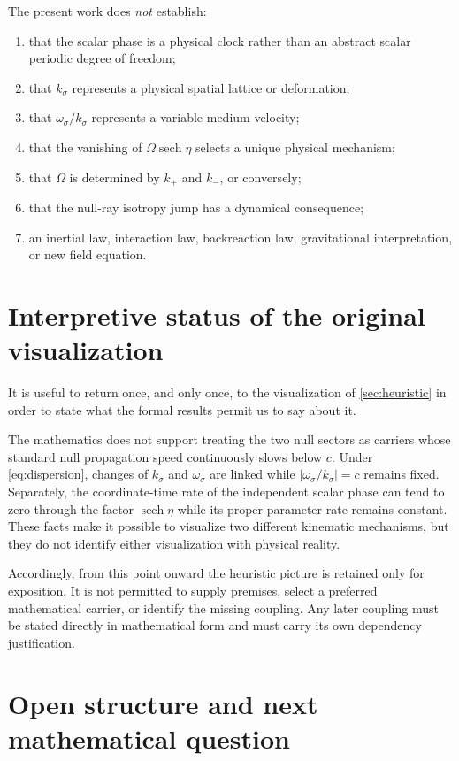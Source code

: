 \documentclass[11pt,a4paper]{article}
\newcommand{\sech}{\operatorname{sech}}
\begin{document}
The present work does \emph{not} establish:
\begin{enumerate}[label=\arabic*.]
\item that the scalar phase is a physical clock rather than an abstract scalar periodic degree of freedom;
\item that $k_\sigma$ represents a physical spatial lattice or deformation;
\item that $\omega_\sigma/k_\sigma$ represents a variable medium velocity;
\item that the vanishing of $\Omega\sech\eta$ selects a unique physical mechanism;
\item that $\Omega$ is determined by $k_+$ and $k_-$, or conversely;
\item that the null-ray isotropy jump has a dynamical consequence;
\item an inertial law, interaction law, backreaction law, gravitational interpretation, or new field equation.
\end{enumerate}

\section{Interpretive status of the original visualization}

It is useful to return once, and only once, to the visualization of \cref{sec:heuristic} in order to state what the formal results permit us to say about it.

The mathematics does not support treating the two null sectors as carriers whose standard null propagation speed continuously slows below $c$.  Under \eqref{eq:dispersion}, changes of $k_\sigma$ and $\omega_\sigma$ are linked while $|\omega_\sigma/k_\sigma|=c$ remains fixed.  Separately, the coordinate-time rate of the independent scalar phase can tend to zero through the factor $\sech\eta$ while its proper-parameter rate remains constant.  These facts make it possible to visualize two different kinematic mechanisms, but they do not identify either visualization with physical reality.

Accordingly, from this point onward the heuristic picture is retained only for exposition.  It is not permitted to supply premises, select a preferred mathematical carrier, or identify the missing coupling.  Any later coupling must be stated directly in mathematical form and must carry its own dependency justification.

\section{Open structure and next mathematical question}
\end{document}

